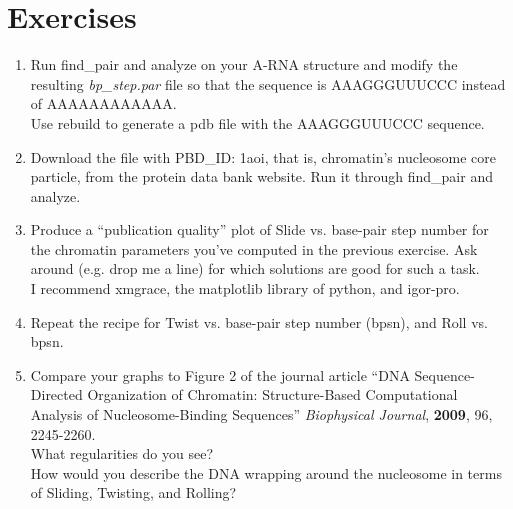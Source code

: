 \section{Exercises}
\begin{enumerate}
\item{Run   \textrm{find\_pair}  and  \textrm{analyze}   on  your  A-RNA
structure and modify the  resulting \textit{bp\_step.par} file so that
the sequence is AAAGGGUUUCCC instead of AAAAAAAAAAAA.\\
Use rebuild to generate a pdb file with the AAAGGGUUUCCC sequence.}
\item{Download the file with PBD\_ID: 1aoi, that is, chromatin's
nucleosome core particle,  from the protein data bank  website. Run it
through \textrm{find\_pair} and \textrm{analyze}.}
\item{Produce a  ``publication quality''  plot of Slide  vs. base-pair
    step number  for the chromatin  parameters you've computed  in the
    previous exercise.  Ask around (e.g.  drop me a line) for which solutions
    are  good  for  such  a  task.\\ I  recommend  \textrm{xmgrace},  the
   \textrm{matplotlib} library of \textrm{python}, and  \textrm{igor-pro}.}
\item{Repeat the recipe for Twist vs. base-pair step number (bpsn), and Roll
    vs. bpsn.}
\item{Compare your  graphs to  Figure 2 of  the journal  article ``DNA
    Sequence-Directed   Organization  of   Chromatin:  Structure-Based
    Computational    Analysis   of    Nucleosome-Binding   Sequences''
    \textit{Biophysical Journal}, \textbf{2009}, 96, 2245-2260.\\  What
    regularities do  you see?\\  How would you  describe the  DNA wrapping
    around the nucleosome in terms of Sliding, Twisting, and Rolling?}
\end{enumerate}









